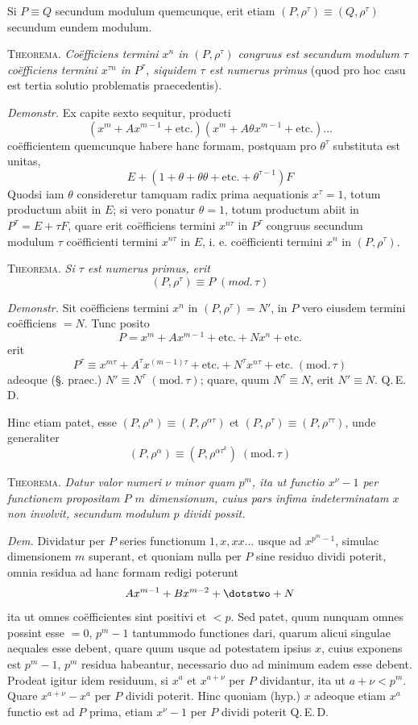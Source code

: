 Si $P\equiv Q$ secundum modulum quemcunque, erit etiam $(P,\rho^\tau)\equiv(Q,\rho^\tau)$ secundum eundem modulum.

\textsc{Theorema.} \emph{Coëfficiens termini $x^n$ in $(P,\rho^\tau)$ congruus est secundum modulum $\tau$ coëfficiens termini $x^{\tau n}$ in $P^\tau$, siquidem $\tau$ est numerus primus} (quod pro hoc casu est tertia solutio problematis praecedentis).

\emph{Demonstr.} Ex capite sexto sequitur, producti
\[
(x^m+Ax^{m-1}+\text{etc.})(x^m+A\theta x^{m-1}+\text{etc.})\ldots
\]
coëfficientem quemcunque habere hanc formam, postquam pro $\theta^\tau$ substituta est unitas,
\[
E+(1+\theta+\theta\theta+\text{etc.}+\theta^{\tau-1})F
\]
Quodsi iam $\theta$ consideretur tamquam radix prima aequationis $x^\tau=1$, totum productum abiit in $E$; si vero ponatur $\theta=1$, totum productum abiit in $P^\tau=E+\tau F$, quare erit coëfficiens termini $x^{n\tau}$ in $P^\tau$ congruus secundum modulum $\tau$ coëfficienti termini $x^{n\tau}$ in $E$, i. e. coëfficienti termini $x^n$ in $(P,\rho^\tau)$.

\textsc{Theorema.} \emph{Si $\tau$ est numerus primus, erit}
\[
(P,\rho^\tau)\equiv P\;(\mathit{mod.}\,\tau)
\]

\emph{Demonstr.} Sit coëfficiens termini $x^n$ in $(P,\rho^\tau)=N'$, in $P$ vero eiusdem termini coëfficiens $=N$. Tunc posito
\[
P=x^m+Ax^{m-1}+\text{etc.}+Nx^n+\text{etc.}
\]
erit
\[
P^\tau\equiv x^{m\tau}+A^\tau x^{(m-1)\tau}+\text{etc.}+N^\tau x^{n\tau}+\text{etc.}\;(\mathrm{mod.}\,\tau)
\]
adeoque (§. praec.) $N'\equiv N^\tau\;(\mathrm{mod.}\,\tau)$; quare, quum $N^\tau\equiv N$, erit $N'\equiv N$. Q.\,E.\,D.

Hinc etiam patet, esse $(P,\rho^\alpha)\equiv(P,\rho^{\alpha\tau})$ et $(P,\rho^\tau)\equiv(P,\rho^{\tau\tau})$, unde generaliter
\[
(P,\rho^\alpha)\equiv(P,\rho^{\alpha\tau^k})\;(\mathrm{mod.}\,\tau)
\]

\textsc{Theorema.} \emph{Datur valor numeri $\nu$ minor quam $p^m$, ita ut functio $x^\nu-1$ per functionem propositam $P$ $m$ dimensionum, cuius pars infima indeterminatam $x$ non involvit, secundum modulum $p$ dividi possit.}

\emph{Dem.} Dividatur per $P$ series functionum $1,x,xx\ldots$ usque ad $x^{p^m-1}$, simulac dimensionem $m$ superant, et quoniam nulla per $P$ sine residuo dividi poterit, omnia residua ad hanc formam redigi poterunt
\[
Ax^{m-1}+Bx^{m-2}+\dotstwo+N
\]
ita ut omnes coëfficientes sint positivi et $<p$. Sed patet, quum nunquam omnes possint esse $=0$, $p^m-1$ tantummodo functiones dari, quarum alicui singulae aequales esse debent, quare quum usque ad potestatem ipsius $x$, cuius exponens est $p^m-1$, $p^m$ residua habeantur, necessario duo ad minimum eadem esse debent. Prodeat igitur idem residuum, si $x^a$ et $x^{a+\nu}$ per $P$ dividantur, ita ut $a+\nu<p^m$. Quare $x^{a+\nu}-x^a$ per $P$ dividi poterit. Hinc quoniam (hyp.) $x$ adeoque etiam $x^a$ functio est ad $P$ prima, etiam $x^\nu-1$ per $P$ dividi poterit Q.\,E.\,D.

